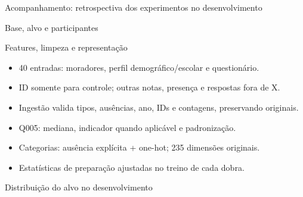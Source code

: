 

\begin{frame}\titlepage\centering\textcolor{verde}{Acompanhamento: retrospectiva dos experimentos no desenvolvimento}\end{frame}
\begin{frame}{Base, alvo e participantes}
\end{frame}
\begin{frame}{Features, limpeza e representação}
\begin{itemize}\item 40 entradas: moradores, perfil demográfico/escolar e questionário.
\item ID somente para controle; outras notas, presença e respostas fora de X.
\item Ingestão valida tipos, ausências, ano, IDs e contagens, preservando originais.
\item Q005: mediana, indicador quando aplicável e padronização.
\item Categorias: ausência explícita + one-hot; 235 dimensões originais.
\item Estatísticas de preparação ajustadas no treino de cada dobra.\end{itemize}
\end{frame}
\begin{frame}{Distribuição do alvo no desenvolvimento}
\end{frame}
